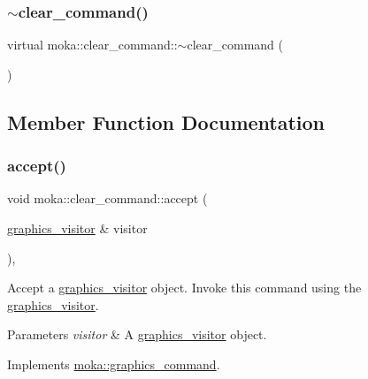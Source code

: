 \subsubsection{\texorpdfstring{$\sim$clear\_command()}{~clear\_command()}}
{\footnotesize\ttfamily virtual moka\+::clear\+\_\+command\+::$\sim$clear\+\_\+command (\begin{DoxyParamCaption}{ }\end{DoxyParamCaption})\hspace{0.3cm}{\ttfamily [virtual]}}



\subsection{Member Function Documentation}
\mbox{\label{classmoka_1_1clear__command_a321fa172131c9219f1a8a57e228215fb}} 
\subsubsection{\texorpdfstring{accept()}{accept()}}
{\footnotesize\ttfamily void moka\+::clear\+\_\+command\+::accept (\begin{DoxyParamCaption}\item[{\mbox{\hyperlink{classmoka_1_1graphics__visitor}{graphics\+\_\+visitor}} \&}]{visitor }\end{DoxyParamCaption})\hspace{0.3cm}{\ttfamily [override]}, {\ttfamily [virtual]}}



Accept a \mbox{\hyperlink{classmoka_1_1graphics__visitor}{graphics\+\_\+visitor}} object. Invoke this command using the \mbox{\hyperlink{classmoka_1_1graphics__visitor}{graphics\+\_\+visitor}}. 


\begin{DoxyParams}{Parameters}
{\em visitor} & A \mbox{\hyperlink{classmoka_1_1graphics__visitor}{graphics\+\_\+visitor}} object. \\
\hline
\end{DoxyParams}


Implements \mbox{\hyperlink{classmoka_1_1graphics__command_a7affaeceb1019ab358c62185bce4e654}{moka\+::graphics\+\_\+command}}.

\mbox{\label{classmoka_1_1clear__command_a0dab48e1983dbafdacb2d06d68fdfc92}} 

